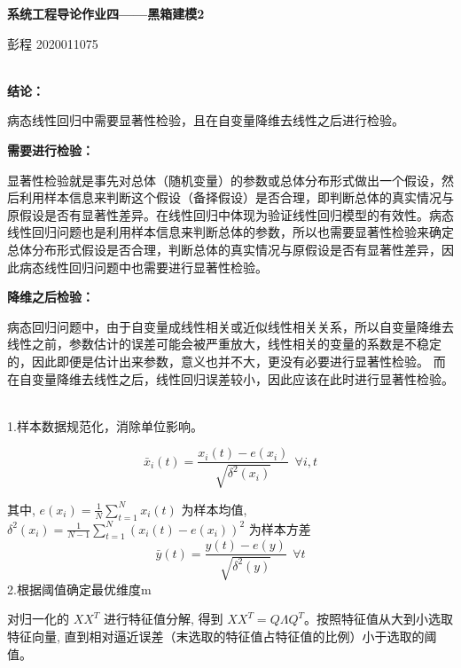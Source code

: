 \documentclass[UTF8]{ctexart}
\begin{document}
\begin{center}
  \textbf{\LARGE{系统工程导论作业四——黑箱建模2}}\\
\end{center}
\begin{center}
  \large{彭程 2020011075}
\end{center}


\noindent \textbf{}\\

\noindent \textbf{结论：}

病态线性回归中需要显著性检验，且在自变量降维去线性之后进行检验。

\noindent \textbf{需要进行检验：}

显著性检验就是事先对总体（随机变量）的参数或总体分布形式做出一个假设，然后利用样本信息来判断这个假设（备择假设）是否合理，即判断总体的真实情况与原假设是否有显著性差异。在线性回归中体现为验证线性回归模型的有效性。病态线性回归问题也是利用样本信息来判断总体的参数，所以也需要显著性检验来确定总体分布形式假设是否合理，判断总体的真实情况与原假设是否有显著性差异，因此病态线性回归问题中也需要进行显著性检验。

\noindent \textbf{降维之后检验：}

病态回归问题中，由于自变量成线性相关或近似线性相关关系，所以自变量降维去线性之前，参数估计的误差可能会被严重放大，线性相关的变量的系数是不稳定的，因此即便是估计出来参数，意义也并不大，更没有必要进行显著性检验。 而在自变量降维去线性之后，线性回归误差较小，因此应该在此时进行显著性检验。\\


\noindent \textbf{}\\

\noindent \textbf{}

\noindent 1.样本数据规范化，消除单位影响。

$$
\bar{x}_{i}(t)=\frac{x_{i}(t)-e\left(x_{i}\right)}{\sqrt{\delta^{2}\left(x_{i}\right)}} ~~\forall i, t
$$

其中,  $e\left(x_{i}\right)=\frac{1}{N} \sum_{t=1}^{N} x_{i}(t)$  为样本均值, $ \delta^{2}\left(x_{i}\right)=\frac{1}{N-1} \sum_{t=1}^{N} \left(x_{i}(t)-e\left(x_{i}\right)\right)^{2} $ 为样本方差
$$
\bar{y}(t)=\frac{y(t)-e(y)}{\sqrt{\delta^{2}(y)}} ~~\forall t
$$
\noindent 2.根据阈值确定最优维度m

对归一化的  $X X^{T}$  进行特征值分解, 得到 $ X X^{T}=Q \Lambda Q^{T} $。按照特征值从大到小选取特征向量, 直到相对逼近误差（末选取的特征值占特征值的比例）小于选取的阈值。\\
\end{document}
